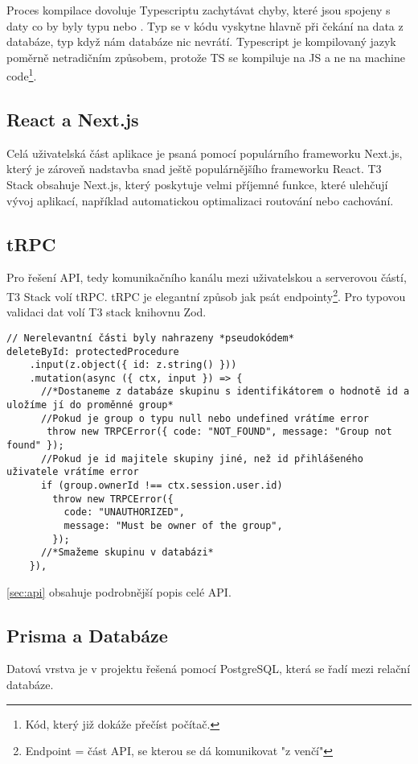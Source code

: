 Proces kompilace dovoluje Typescriptu zachytávat chyby, které jsou spojeny s daty co by byly typu  nebo . Typ  se v kódu vyskytne hlavně při čekání na data z databáze, typ  když nám databáze nic nevrátí.
Typescript je kompilovaný jazyk poměrně netradičním způsobem, protože TS se kompiluje na JS a ne na machine code\footnote{Kód, který již dokáže přečíst počítač.}.

\subsection{React a Next.js}

Celá uživatelská část aplikace je psaná pomocí populárního frameworku Next.js, který je zároveň nadstavba snad ještě populárnějšího frameworku React. T3 Stack obsahuje Next.js, který poskytuje velmi příjemné funkce, které ulehčují vývoj aplikací, například automatickou optimalizaci routování nebo cachování\cite{vercel}.

\subsection{tRPC}
Pro řešení API, tedy komunikačního kanálu mezi uživatelskou a serverovou částí, T3 Stack volí tRPC. tRPC je elegantní způsob jak psát endpointy\footnote{Endpoint = část API, se kterou se dá komunikovat "z venčí"}. Pro typovou validaci dat volí T3 stack knihovnu Zod\cite{zod}.
\begin{lstlisting}[caption={Úryvek z "groups" routeru zobrazující mazání skupiny}]
// Nerelevantní části byly nahrazeny *pseudokódem*
deleteById: protectedProcedure
    .input(z.object({ id: z.string() }))
    .mutation(async ({ ctx, input }) => {
      //*Dostaneme z databáze skupinu s identifikátorem o hodnotě id a uložíme jí do proměnné group*
      //Pokud je group o typu null nebo undefined vrátíme error
       throw new TRPCError({ code: "NOT_FOUND", message: "Group not found" });
      //Pokud je id majitele skupiny jiné, než id přihlášeného uživatele vrátíme error
      if (group.ownerId !== ctx.session.user.id)
        throw new TRPCError({
          code: "UNAUTHORIZED",
          message: "Must be owner of the group",
        });
      //*Smažeme skupinu v databázi*
    }),
\end{lstlisting}
\autoref{sec:api} obsahuje podrobnější popis celé API.

\subsection{Prisma a Databáze}
Datová vrstva je v projektu řešená pomocí PostgreSQL, která se řadí mezi relační databáze.

